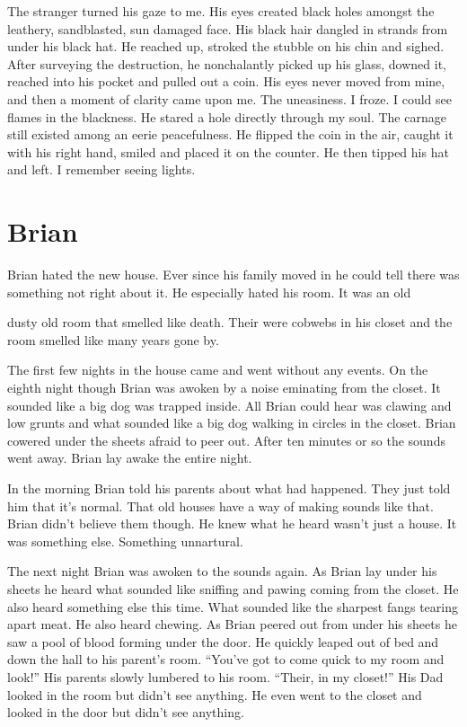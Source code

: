 The stranger turned his gaze to me. His eyes created black holes
amongst the leathery, sandblasted, sun damaged face. His black hair
dangled in strands from under his black hat. He reached up, stroked
the stubble on his chin and sighed. After surveying the
destruction, he nonchalantly picked up his glass, downed it,
reached into his pocket and pulled out a coin. His eyes never moved
from mine, and then a moment of clarity came upon me. The
uneasiness. I froze. I could see flames in the blackness. He stared
a hole directly through my soul. The carnage still existed among an
eerie peacefulness. He flipped the coin in the air, caught it with
his right hand, smiled and placed it on the counter. He then tipped
his hat and left. I remember seeing lights. 

 



\chapter{Brian}





Brian hated the new house. Ever since his family moved in he could
tell there was something not right about it. He especially hated
his room. It was an old

dusty old room that smelled like death. Their were cobwebs in his
closet and the room smelled like many years gone by.



The first few nights in the house came and went without any events.
On the eighth night though Brian was awoken by a noise eminating
from the closet. It sounded like a big dog was trapped inside. All
Brian could hear was clawing and low grunts and what sounded like a
big dog walking in circles in the closet. Brian cowered under the
sheets afraid to peer out. After ten minutes or so the sounds went
away. Brian lay awake the entire night.



In the morning Brian told his parents about what had happened. They
just told him that it's normal. That old houses have a way of
making sounds like that. Brian didn't believe them though. He knew
what he heard wasn't just a house. It was something else. Something
unnartural.



The next night Brian was awoken to the sounds again. As Brian lay
under his sheets he heard what sounded like sniffing and pawing
coming from the closet. He also heard something else this time.
What sounded like the sharpest fangs tearing apart meat. He also
heard chewing. As Brian peered out from under his sheets he saw a
pool of blood forming under the door. He quickly leaped out of bed
and down the hall to his parent's room. ``You've got to come quick
to my room and look!'' His parents slowly lumbered to his room.
``Their, in my closet!'' His Dad looked in the room but didn't see
anything. He even went to the closet and looked in the door but
didn't see anything.



